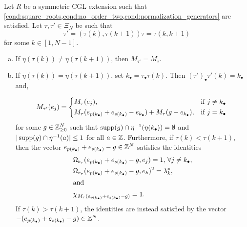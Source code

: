 \begin{proposition}\label{prop:mutation_adjacent_permutations}
	Let $R$ be a symmetric CGL extension such that \cref{cond:square_roots,cond:no_order_two,cond:normalization_generators} are satisfied. Let $\tau, \tau' \in \Xi_N$ be such that
	\begin{equation*}
		\tau' = (\tau(k), \tau(k+1))\tau = \tau(k, k+1)
	\end{equation*}
	for some $k \in [1, N-1]$.
	\begin{enumerate}[(a)]
		\item If $\eta(\tau(k)) \neq \eta(\tau(k + 1))$, then $M_{\tau'} = M_\tau$.
		\item If $\eta(\tau(k)) = \eta(\tau(k+1))$, set $k_\bullet = \tau_\bullet\tau(k)$. Then
		      $(\tau')_\bullet\tau'(k) = k_\bullet$ and,

		      \begin{equation*}
			      M_{\tau'}(e_j) = \begin{dcases*}
				      M_{\tau}(e_j),                                                                         & if $j \neq k_\bullet$ \\
				      M_\tau(e_{p(k_\bullet)} + e_{s(k_\bullet)} - e_{k_\bullet}) + M_\tau(g-e_{k_\bullet}), & if $j =k_\bullet$
			      \end{dcases*}
		      \end{equation*}
		      for some $g \in \mathbb{Z}^N_{\geq 0}$ such that $\operatorname{supp}(g)\cap \eta^{-1}(\eta(k_\bullet)) = \emptyset$ and $|\operatorname{supp}(g)\cap \eta ^{-1} (a)| \leq 1$ for all $a \in \mathbb{Z}$. Furthermore, if $\tau(k) < \tau(k +1)$, then the vector $e_{p(k_\bullet)} + e_{s(k_\bullet)} - g \in \mathbb{Z}^N$ satisfies the identities
		      \begin{align*}
			       & \Omega_{\mathbf{r}_\tau}(e_{p(k_\bullet)} + e_{s(k_\bullet)} - g, e_j) = 1, \, \forall j \neq k_\bullet, \\
			       & \Omega_{\mathbf{r}_\tau}(e_{p(k_\bullet)} + e_{s(k_\bullet)} - g, e_k)^2 = \lambda^*_k,                  \\
			      \shortintertext{and}
			       & \chi_{M_\tau(e_{p(k_\bullet)} + e_{s(k_\bullet)} - g)} = 1.
		      \end{align*}
		      If $\tau(k) > \tau(k+1)$, the identities are instead satisfied by the vector
		      $-(e_{p(k_\bullet)} + e_{s(k_\bullet)} -g) \in \mathbb{Z}^N$.
	\end{enumerate}
\end{proposition}
